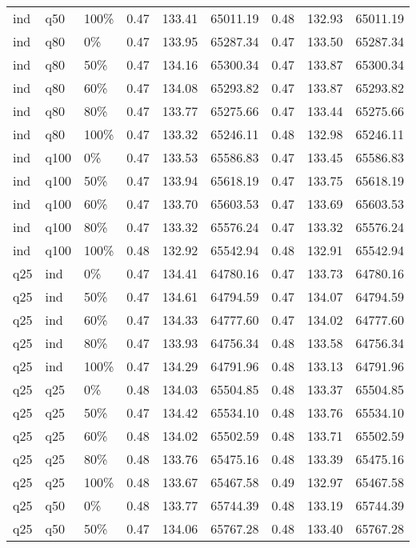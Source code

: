 \begin{longtable}{lllrrrrrr}
  ind & q50 & 100\% & 0.47 & 133.41 & 65011.19 & 0.48 & 132.93 & 65011.19 \\ 
  ind & q80 & 0\% & 0.47 & 133.95 & 65287.34 & 0.47 & 133.50 & 65287.34 \\ 
  ind & q80 & 50\% & 0.47 & 134.16 & 65300.34 & 0.47 & 133.87 & 65300.34 \\ 
  ind & q80 & 60\% & 0.47 & 134.08 & 65293.82 & 0.47 & 133.87 & 65293.82 \\ 
  ind & q80 & 80\% & 0.47 & 133.77 & 65275.66 & 0.47 & 133.44 & 65275.66 \\ 
  ind & q80 & 100\% & 0.47 & 133.32 & 65246.11 & 0.48 & 132.98 & 65246.11 \\ 
  ind & q100 & 0\% & 0.47 & 133.53 & 65586.83 & 0.47 & 133.45 & 65586.83 \\ 
  ind & q100 & 50\% & 0.47 & 133.94 & 65618.19 & 0.47 & 133.75 & 65618.19 \\ 
  ind & q100 & 60\% & 0.47 & 133.70 & 65603.53 & 0.47 & 133.69 & 65603.53 \\ 
  ind & q100 & 80\% & 0.47 & 133.32 & 65576.24 & 0.47 & 133.32 & 65576.24 \\ 
  ind & q100 & 100\% & 0.48 & 132.92 & 65542.94 & 0.48 & 132.91 & 65542.94 \\ 
  q25 & ind & 0\% & 0.47 & 134.41 & 64780.16 & 0.47 & 133.73 & 64780.16 \\ 
  q25 & ind & 50\% & 0.47 & 134.61 & 64794.59 & 0.47 & 134.07 & 64794.59 \\ 
  q25 & ind & 60\% & 0.47 & 134.33 & 64777.60 & 0.47 & 134.02 & 64777.60 \\ 
  q25 & ind & 80\% & 0.47 & 133.93 & 64756.34 & 0.48 & 133.58 & 64756.34 \\ 
  q25 & ind & 100\% & 0.47 & 134.29 & 64791.96 & 0.48 & 133.13 & 64791.96 \\ 
  q25 & q25 & 0\% & 0.48 & 134.03 & 65504.85 & 0.48 & 133.37 & 65504.85 \\ 
  q25 & q25 & 50\% & 0.47 & 134.42 & 65534.10 & 0.48 & 133.76 & 65534.10 \\ 
  q25 & q25 & 60\% & 0.48 & 134.02 & 65502.59 & 0.48 & 133.71 & 65502.59 \\ 
  q25 & q25 & 80\% & 0.48 & 133.76 & 65475.16 & 0.48 & 133.39 & 65475.16 \\ 
  q25 & q25 & 100\% & 0.48 & 133.67 & 65467.58 & 0.49 & 132.97 & 65467.58 \\ 
  q25 & q50 & 0\% & 0.48 & 133.77 & 65744.39 & 0.48 & 133.19 & 65744.39 \\ 
  q25 & q50 & 50\% & 0.47 & 134.06 & 65767.28 & 0.48 & 133.40 & 65767.28 \\ 

\end{longtable}

